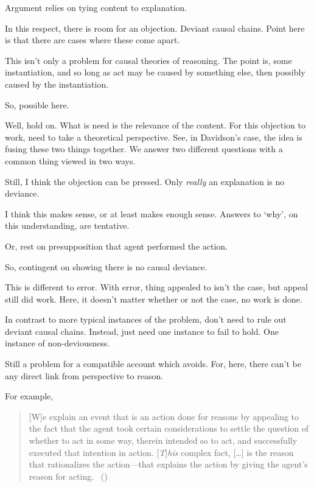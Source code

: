 \begin{note}
  Argument relies on tying content to explanation.

  In this respect, there is room for an objection.
  Deviant causal chains.
  Point here is that there are cases where these come apart.

  This isn't only a problem for causal theories of reasoning.
  The point is, some instantiation, and so long as act may be caused by something else, then possibly caused by the instantiation.

  So, possible here.

  Well, hold on.
  What is need is the relevance of the content.
  For this objection to work, need to take a theoretical perspective.
  See, in Davidson's case, the idea is fusing these two things together.
  We answer two different questions with a common thing viewed in two ways.

  Still, I think the objection can be pressed.
  Only \emph{really} an explanation is no deviance.

  I think this makes sense, or at least makes enough sense.
  Answers to `why', on this understanding, are tentative.

  Or, rest on presupposition that agent performed the action.

  So, contingent on showing there is no causal deviance.

  This is different to error.
  With error, thing appealed to isn't the case, but appeal still did work.
  Here, it doesn't matter whether or not the case, no work is done.

  In contrast to more typical instances of the problem, don't need to rule out deviant causal chains.
  Instead, just need one instance to fail to hold.
  One instance of non-deviousness.

  Still a problem for a compatible account which avoids.
  For, here, there can't be any direct link from perspective to reason.

  For example, \citeauthor{Hieronymi:2011aa}

    \begin{quote}
      [W]e explain an event that is an action done for reasons by appealing to the fact that the agent took certain considerations to settle the question of whether to act in some way, therein intended so to act, and successfully executed that intention in action.
    [\emph{T}]\emph{his} complex fact, [\dots] is the reason that rationalizes the action---that explains the action by giving the agent’s reason for acting.%
    \mbox{ }\hfill\mbox{(\citeyear[431]{Hieronymi:2011aa})}
  \end{quote}


\end{note}
